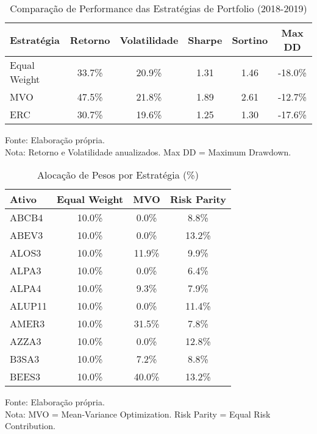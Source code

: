 \begin{table}[htbp]
\centering
\caption{Comparação de Performance das Estratégias de Portfolio (2018-2019)}
\label{tab:performance_estrategias}
\begin{tabular}{|l|c|c|c|c|c|}
\hline
\textbf{Estratégia} & \textbf{Retorno} & \textbf{Volatilidade} & \textbf{Sharpe} & \textbf{Sortino} & \textbf{Max DD} \\
\hline
Equal Weight & 33.7\% & 20.9\% & 1.31 & 1.46 & -18.0\% \\
MVO & 47.5\% & 21.8\% & 1.89 & 2.61 & -12.7\% \\
ERC & 30.7\% & 19.6\% & 1.25 & 1.30 & -17.6\% \\
\hline
\end{tabular}
\footnotesize
Fonte: Elaboração própria.\\
Nota: Retorno e Volatilidade anualizados. Max DD = Maximum Drawdown.
\end{table}


\begin{table}[htbp]
\centering
\caption{Alocação de Pesos por Estratégia (\%)}
\label{tab:pesos_portfolios}
\begin{tabular}{|l|c|c|c|}
\hline
\textbf{Ativo} & \textbf{Equal Weight} & \textbf{MVO} & \textbf{Risk Parity} \\
\hline
ABCB4 & 10.0\% & 0.0\% & 8.8\% \\
ABEV3 & 10.0\% & 0.0\% & 13.2\% \\
ALOS3 & 10.0\% & 11.9\% & 9.9\% \\
ALPA3 & 10.0\% & 0.0\% & 6.4\% \\
ALPA4 & 10.0\% & 9.3\% & 7.9\% \\
ALUP11 & 10.0\% & 0.0\% & 11.4\% \\
AMER3 & 10.0\% & 31.5\% & 7.8\% \\
AZZA3 & 10.0\% & 0.0\% & 12.8\% \\
B3SA3 & 10.0\% & 7.2\% & 8.8\% \\
BEES3 & 10.0\% & 40.0\% & 13.2\% \\
\hline
\end{tabular}
\footnotesize
Fonte: Elaboração própria.\\
Nota: MVO = Mean-Variance Optimization. Risk Parity = Equal Risk Contribution.
\end{table}
